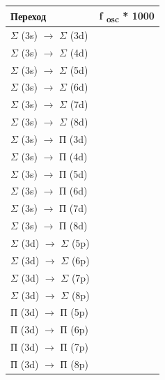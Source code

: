 \begin{flushleft}
\tablefirsthead{}
\tablehead{}
\tabletail{}
\tablelasttail{}
\begin{supertabular}{|m{5.076cm}|m{5.302cm}|}
\hline
\textbf{{Переход}} &
\textbf{{f }}\textbf{{\textsubscript{osc}}}\textbf{{ * 1000}}\\\hline
{$\Sigma $ (3s) $\rightarrow $ $\Sigma $ (3d)} &
\raggedleft{}\\
{$\Sigma $ (3s) $\rightarrow $ $\Sigma $ (4d)} &
\raggedleft{}\\
{$\Sigma $ (3s) $\rightarrow $ $\Sigma $ (5d)} &
\raggedleft{}\\
{$\Sigma $ (3s) $\rightarrow $ $\Sigma $ (6d)} &
\raggedleft{}\\
{$\Sigma $ (3s) $\rightarrow $ $\Sigma $ (7d)} &
\raggedleft{}\\
{$\Sigma $ (3s) $\rightarrow $ $\Sigma $ (8d)} &
\raggedleft{}\\\hline
{$\Sigma $ (3s) $\rightarrow $ П (3d)} &
\raggedleft{}\\
{$\Sigma $ (3s) $\rightarrow $ П (4d)} &
\raggedleft{}\\
{$\Sigma $ (3s) $\rightarrow $ П (5d)} &
\raggedleft{}\\
{$\Sigma $ (3s) $\rightarrow $ П (6d)} &
\raggedleft{}\\
{$\Sigma $ (3s) $\rightarrow $ П (7d)} &
\raggedleft{}\\
{$\Sigma $ (3s) $\rightarrow $ П (8d)} &
\raggedleft{}\\\hline
{$\Sigma $ (3d) $\rightarrow $ $\Sigma $ (5p)} &
\raggedleft{}\\
{$\Sigma $ (3d) $\rightarrow $ $\Sigma $ (6p)} &
\raggedleft{}\\
{$\Sigma $ (3d) $\rightarrow $ $\Sigma $ (7p)} &
\raggedleft{}\\
{$\Sigma $ (3d) $\rightarrow $ $\Sigma $ (8p)} &
\raggedleft{}\\\hline
{П (3d) $\rightarrow $ П (5p)} &
\raggedleft{}\\
{П (3d) $\rightarrow $ П (6p)} &
\raggedleft{}\\
{П (3d) $\rightarrow $ П (7p)} &
\raggedleft{}\\
{П (3d) $\rightarrow $ П (8p)} &
\raggedleft{}\\\hline
\end{supertabular}
\end{flushleft}


